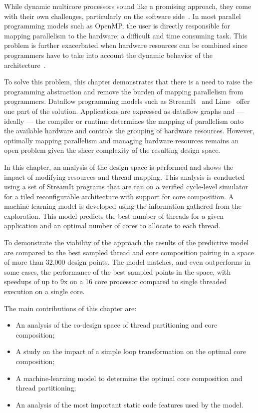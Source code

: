While dynamic multicore processors sound like a promising approach, they come with their own challenges, particularly on the software side~\cite{wells2009needfordmc}.
In most parallel programming models such as OpenMP, the user is directly responsible for mapping parallelism to the hardware; a difficult and time consuming task.
This problem is further exacerbated when hardware resources can be combined since programmers have to take into account the dynamic behavior of the architecture~\cite{bower2008impactd}.

To solve this problem, this chapter demonstrates that there is a need to raise the programming abstraction and remove the burden of mapping parallelism from programmers.
Dataflow programming models such as StreamIt~\cite{theis2002streamit} and Lime~\cite{auerbach2012lime} offer one part of the solution.
Applications are expressed as dataflow graphs and --- ideally --- the compiler or runtime determines the mapping of parallelism onto the available hardware and controls the grouping of hardware resources.
However, optimally mapping parallelism and managing hardware resources remains an open problem given the sheer complexity of the resulting design space.

In this chapter, an analysis of the design space is performed and shows the impact of modifying resources and thread mapping.
This analysis is conducted using a set of StreamIt programs that are ran on a verified cycle-level simulator for a tiled reconfigurable architecture with support for core composition.
A machine learning model is developed using the information gathered from the exploration.
This model predicts the best number of threads for a given application and an optimal number of cores to allocate to each thread.

To demonstrate the viability of the approach the results of the predictive model are compared to the best sampled thread and core composition pairing in a space of more than 32,000 design points.
The model matches, and even outperforms in some cases, the performance of the best sampled points in the space, with speedups of up to 9x on a 16 core processor compared to single threaded execution on a single core. 

The main contributions of this chapter are:
\vspace{-1mm}
\begin{itemize}
\item An analysis of the co-design space of thread partitioning and core composition;
\item A study on the impact of a simple loop transformation on the optimal core composition;
\item A machine-learning model to determine the optimal core composition and thread partitioning;
\item An analysis of the most important static code features used by the model.
\end{itemize}


